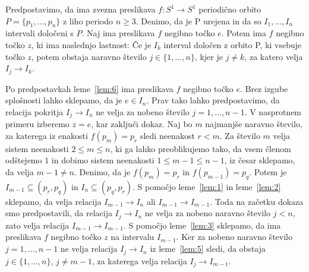 \documentclass[../TG_magistrsko_delo_sections.tex]{subfiles}
\begin{document}
\begin{lema}\label{lem:6}				%
Predpostavimo, da ima zvezna preslikava $f \colon S^1 \to S^1$ periodično orbito $P = \{p_1, \dots, p_n\}$ z liho periodo $n \geq 3$. Denimo, da je P urejena in da so $I_1, \dots, I_n$ intervali določeni s $P$. Naj ima preslikava $f$ negibno točko $e$. Potem ima $f$ negibno točko $z$, ki ima naslednjo lastnost: Če je $I_k$ interval določen z orbito P, ki vsebuje točko $z$, potem obstaja naravno število $j \in \{1, \dots, n\}$, kjer je $j \neq k$, za katero velja $I_j \to I_k$.
\end{lema}

\begin{dokaz}
Po predpostavkah leme~\ref{lem:6} ima preslikava $f$ negibno točko $e$. Brez izgube splošnosti lahko sklepamo, da je $e \in I_n$. Prav tako lahko predpostavimo, da relacija pokritja $I_j \to I_n$ ne velja za nobeno število $j = 1, \dots, n-1$. V nasprotnem primeru izberemo $z=e$, kar zaključi dokaz.
Naj bo $m$ najmanjše naravno število, za katerega iz enakosti $f(p_m) = p_r$ sledi neenakost $r < m$. Za število $m$ velja sistem neenakosti $2 \leq m \leq n$, ki ga lahko preoblikujemo tako, da vsem členom odštejemo $1$ in dobimo sistem neenakosti $1 \leq m -1 \leq n-1$, iz česar sklepamo, da velja $m-1 \neq n$. Denimo, da je $f(p_m) = p_r$ in $f(p_{m-1}) = p_q$. Potem je $I_{m-1} \subseteq (p_r, p_q)$ in $I_n \subseteq (p_q, p_r)$. S pomočjo leme~\ref{lem:1} in leme~\ref{lem:2} sklepamo, da velja relacija $I_{m-1} \to I_n$ ali $I_{m-1} \to I_{m-1}$. Toda na začetku dokaza smo predpostavili, da relacija $I_{j} \to I_n$ ne velja za nobeno naravno število $j < n$, zato velja relacija $I_{m-1} \to I_{m-1}$. S pomočjo leme~\ref{lem:3} sklepamo, da ima preslikava $f$ negibno točko $z$ na intervalu $I_{m-1}$. Ker za nobeno naravno število $j = 1, \dots, n-1$ ne velja relacija $I_j \to I_n$ iz leme~\ref{lem:5} sledi, da obstaja $j \in \{1, \dots, n\}$, $j \neq m-1$, za katerega velja relacija $I_j \to I_{m-1}$.
\end{dokaz}
\end{document}
